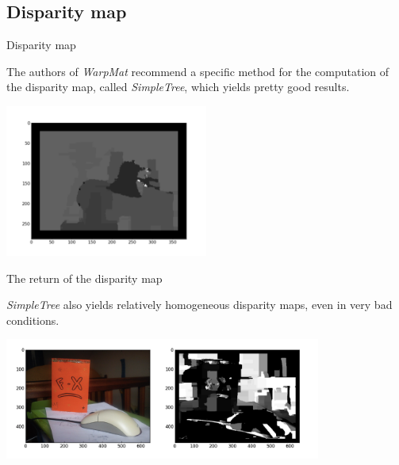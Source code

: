 \documentclass[12pt]{beamer}
\begin{document}
\subsection{Disparity map}

\begin{frame}{Disparity map}
  \begin{block}{}
    The authors of \emph{WarpMat} recommend a specific method for the computation of the disparity map, called \emph{SimpleTree}, which yields pretty good results.
  \end{block}
  \begin{center} \includegraphics[height=5cm]{../images/Disparity-Tsukuba.png} \end{center}
\end{frame}

\begin{frame}{The return of the disparity map}
  \begin{block}{}
    \emph{SimpleTree} also yields relatively homogeneous disparity maps, even in very bad conditions.
  \end{block}

  \begin{center} \includegraphics[height=4cm]{../images/Disparity-FX-Both.png} \end{center}
\end{frame}
\end{document}
